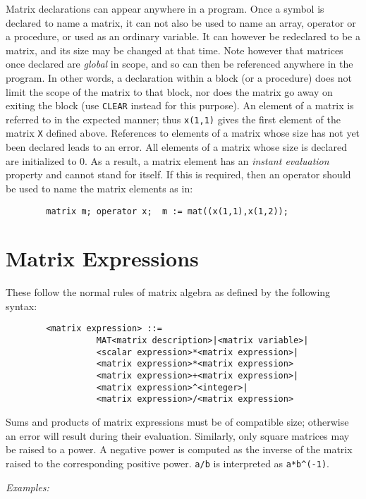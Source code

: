 Matrix declarations can appear anywhere in a program. Once a symbol is
declared to name a matrix, it can not also be used to name an array,
operator or a procedure, or used as an ordinary variable. It can however
be redeclared to be a matrix, and its size may be changed at that time.
Note however that matrices once declared are {\em global\/} in scope, and so
can then be referenced anywhere in the program.  In other words, a
declaration within a block (or a procedure) does not limit the scope of
the matrix to that block, nor does the matrix go away on exiting the block
(use {\tt CLEAR} instead for this purpose).  An element of a matrix is
referred to in the expected manner; thus {\tt x(1,1)} gives the first
element of the matrix {\tt X} defined above.  References to elements of a
matrix whose size has not yet been declared leads to an error.  All
elements of a matrix whose size is declared are initialized to 0.  As a
result, a matrix element has an {\em instant evaluation\/} property and cannot stand for itself.  If this is required,
then an operator should be used to name the matrix elements as in:
\begin{verbatim}
        matrix m; operator x;  m := mat((x(1,1),x(1,2));
\end{verbatim}

\section{Matrix Expressions}

These follow the normal rules of matrix algebra as defined by the
following syntax:
\begin{verbatim}
        <matrix expression> ::=
                  MAT<matrix description>|<matrix variable>|
                  <scalar expression>*<matrix expression>|
                  <matrix expression>*<matrix expression>
                  <matrix expression>+<matrix expression>|
                  <matrix expression>^<integer>|
                  <matrix expression>/<matrix expression>
\end{verbatim}
Sums and products of matrix expressions must be of compatible size;
otherwise an error will result during their evaluation.  Similarly, only
square matrices may be raised to a power.  A negative power is computed as
the inverse of the matrix raised to the corresponding positive power.
{\tt a/b} is interpreted as {\tt a*b\verb|^|(-1)}.

{\it Examples:}


